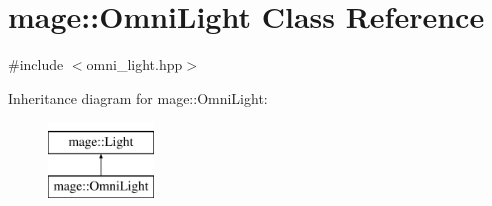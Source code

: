 \hypertarget{classmage_1_1_omni_light}{}\section{mage\+:\+:Omni\+Light Class Reference}
\label{classmage_1_1_omni_light}


{\ttfamily \#include $<$omni\+\_\+light.\+hpp$>$}

Inheritance diagram for mage\+:\+:Omni\+Light\+:\begin{figure}[H]
\begin{center}
\leavevmode
\includegraphics[height=2.000000cm]{classmage_1_1_omni_light}
\end{center}
\end{figure}
